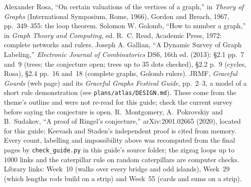 Alexander Rosa, ``On certain valuations of the vertices of a graph,'' in \emph{Theory of Graphs} (International Symposium, Rome, 1966), Gordon and Breach, 1967, pp.~349--355: the loop theorem. Solomon W. Golomb, ``How to number a graph,'' in \emph{Graph Theory and Computing}, ed. R.~C. Read, Academic Press, 1972: complete networks and rulers. Joseph A. Gallian, ``A Dynamic Survey of Graph Labeling,'' \emph{Electronic Journal of Combinatorics} DS6, 16th ed. (2013): \S2.1 pp.~7 and~9 (trees; the conjecture open; trees up to 35 dots checked), \S2.2 p.~9 (cycles, Rosa), \S2.4 pp.~16 and~18 (complete graphs, Golomb rulers). JRMF, \emph{Graceful Gourds} (web page) and its \emph{Graceful Graphs Festival Guide}, pp.~2--3, a model of a short rule demonstration (see \texttt{plans/atlas/DESIGN.md}). These come from the theme's outline and were not re-read for this guide; check the current survey before saying the conjecture is open. R.~Montgomery, A.~Pokrovskiy and B.~Sudakov, ``A proof of Ringel's conjecture,'' arXiv:2001.02665 (2020), located for this guide; Keevash and Staden's independent proof is cited from memory. Every count, labelling and impossibility above was recomputed from the final pages by \texttt{check\_guide.py} in this guide's source folder; the zigzag loops up to $1000$ links and the caterpillar rule on random caterpillars are computer checks. Library links: Week~10 (walks over every bridge and odd islands), Week~29 (which lengths rods build on a strip) and Week~55 (cards and sums on a strip).
